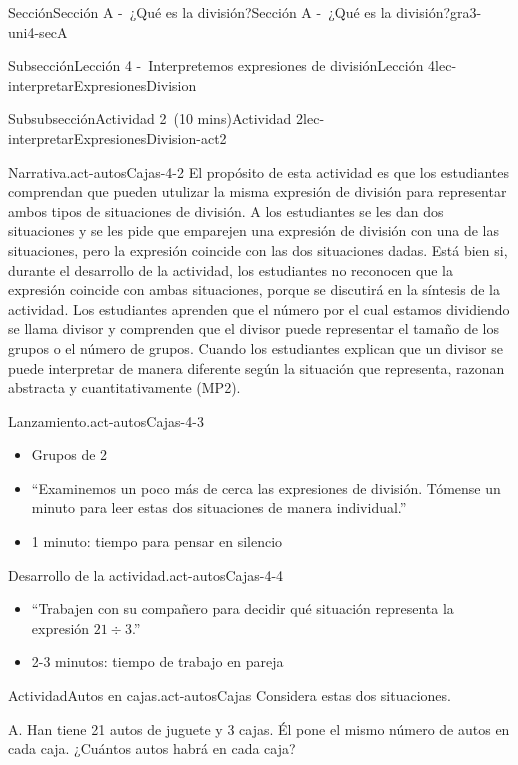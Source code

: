 \documentclass[oneside,10pt,]{article}
\begin{document}
\begin{sectionptx}{Sección}{Sección A -~¿Qué es la división?}{}{Sección A -~¿Qué es la división?}{}{}{gra3-uni4-secA}
\begin{subsectionptx}{Subsección}{Lección 4 -~Interpretemos expresiones de división}{}{Lección 4}{}{}{lec-interpretarExpresionesDivision}
\begin{subsubsectionptx}{Subsubsección}{Actividad 2~(10 mins)}{}{Actividad 2}{}{}{lec-interpretarExpresionesDivision-act2}
\begin{paragraphs}{Narrativa.}{act-autosCajas-4-2}
El propósito de esta actividad es que los estudiantes comprendan que pueden utulizar la misma expresión de división para representar ambos tipos de situaciones de división. A los estudiantes se les dan dos situaciones y se les pide que emparejen una expresión de división con una de las situaciones, pero la expresión coincide con las dos situaciones dadas. Está bien si, durante el desarrollo de la actividad, los estudiantes no reconocen que la expresión coincide con ambas situaciones, porque se discutirá en la síntesis de la actividad. Los estudiantes aprenden que el número por el cual estamos dividiendo se llama divisor y comprenden que el divisor puede representar el tamaño de los grupos o el número de grupos. Cuando los estudiantes explican que un divisor se puede interpretar de manera diferente según la situación que representa, razonan abstracta y cuantitativamente (MP2).%
\end{paragraphs}%
\begin{paragraphs}{Lanzamiento.}{act-autosCajas-4-3}%
%
\begin{itemize}[label=\textbullet]
\item{}Grupos de 2%
\item{}``Examinemos un poco más de cerca las expresiones de división. Tómense un minuto para leer estas dos situaciones de manera individual.''%
\item{}1 minuto: tiempo para pensar en silencio%
\end{itemize}
\end{paragraphs}%
\begin{paragraphs}{Desarrollo de la actividad.}{act-autosCajas-4-4}%
%
\begin{itemize}[label=\textbullet]
\item{}``Trabajen con su compañero para decidir qué situación representa la expresión \(21\div3\).''%
\item{}2-3 minutos: tiempo de trabajo en pareja%
\end{itemize}
\end{paragraphs}%
\begin{activity}{Actividad}{Autos en cajas.}{act-autosCajas}%
Considera estas dos situaciones.%
\begin{sidebyside}{2}{0.05}{0.05}{0.1}%
\begin{sbspanel}{0.4}%
A. Han tiene 21 autos de juguete y 3 cajas. Él pone el mismo número de autos en cada caja. ¿Cuántos autos habrá en cada caja?%
\end{sbspanel}%
\begin{sbspanel}{0.4}%

\end{sbspanel}
\end{sidebyside}
\end{activity}
\end{subsubsectionptx}
\end{subsectionptx}
\end{sectionptx}
\end{document}
